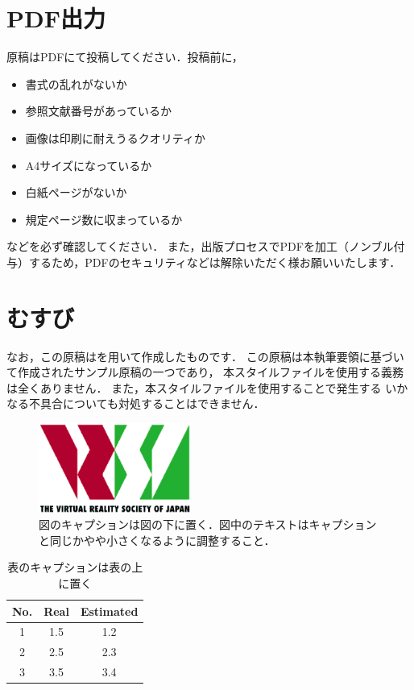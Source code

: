 \documentclass[a4paper]{jarticle}
\begin{document}
\section{PDF出力}
原稿はPDFにて投稿してください．投稿前に，
\begin{itemize}
 \item 書式の乱れがないか
 \item 参照文献番号があっているか
 \item 画像は印刷に耐えうるクオリティか
 \item A4サイズになっているか
 \item 白紙ページがないか
 \item 規定ページ数に収まっているか
\end{itemize}
などを必ず確認してください．
また，出版プロセスでPDFを加工（ノンブル付与）するため，PDFのセキュリティなどは解除いただく様お願いいたします．

\balance

\section{むすび}
なお，この原稿は\LaTeXe を用いて作成したものです．
この原稿は本執筆要領に基づいて作成されたサンプル原稿の一つであり，
本スタイルファイルを使用する義務は全くありません．
また，本スタイルファイルを使用することで発生する
いかなる不具合についても対処することはできません．
\\

\begin{figure}[tb]
  \begin{center}
    \includegraphics*[width=50mm]{logo.eps}
  \end{center}
  \vspace*{-6mm}
  \caption{図のキャプションは図の下に置く．図中のテキストはキャプションと同じかやや小さくなるように調整すること．}
  \label{figure}
\end{figure}

\begin{table}[tb]
\caption{表のキャプションは表の上に置く}
\label{table}
\begin{center}\small
\def\arraystretch{1.2}
\begin{tabular}{|c||c|c|}\hline 
No. & Real & Estimated \\ \hline \hline
1   & 1.5  & 1.2       \\ \hline
2   & 2.5  & 2.3       \\ \hline
3   & 3.5  & 3.4       \\ \hline
\end{tabular}
\end{center}
\vspace*{-3mm}
\end{table}
\end{document}
